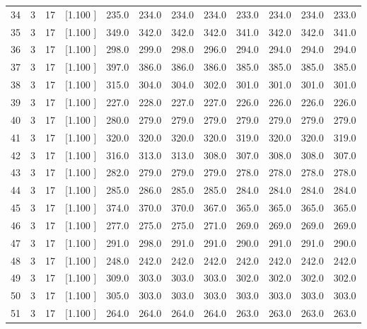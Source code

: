 \documentclass[12pt,a4paper]{article}
\begin{document}
\begin{center}
{\begin{tabular}{r r r r r r r r r r r r}
  34&  3& 17&[1.100     ]&   235.0&   234.0&   234.0&   234.0&   233.0&   234.0&   234.0&   233.0\\[-0.02in]
  35&  3& 17&[1.100     ]&   349.0&   342.0&   342.0&   342.0&   341.0&   342.0&   342.0&   341.0\\[-0.02in]
  36&  3& 17&[1.100     ]&   298.0&   299.0&   298.0&   296.0&   294.0&   294.0&   294.0&   294.0\\[-0.02in]
  37&  3& 17&[1.100     ]&   397.0&   386.0&   386.0&   386.0&   385.0&   385.0&   385.0&   385.0\\[-0.02in]
  38&  3& 17&[1.100     ]&   315.0&   304.0&   304.0&   302.0&   301.0&   301.0&   301.0&   301.0\\[-0.02in]
  39&  3& 17&[1.100     ]&   227.0&   228.0&   227.0&   227.0&   226.0&   226.0&   226.0&   226.0\\[-0.02in]
  40&  3& 17&[1.100     ]&   280.0&   279.0&   279.0&   279.0&   279.0&   279.0&   279.0&   279.0\\[-0.02in]
  41&  3& 17&[1.100     ]&   320.0&   320.0&   320.0&   320.0&   319.0&   320.0&   320.0&   319.0\\[-0.02in]
  42&  3& 17&[1.100     ]&   316.0&   313.0&   313.0&   308.0&   307.0&   308.0&   308.0&   307.0\\[-0.02in]
  43&  3& 17&[1.100     ]&   282.0&   279.0&   279.0&   279.0&   278.0&   278.0&   278.0&   278.0\\[-0.02in]
  44&  3& 17&[1.100     ]&   285.0&   286.0&   285.0&   285.0&   284.0&   284.0&   284.0&   284.0\\[-0.02in]
  45&  3& 17&[1.100     ]&   374.0&   370.0&   370.0&   367.0&   365.0&   365.0&   365.0&   365.0\\[-0.02in]
  46&  3& 17&[1.100     ]&   277.0&   275.0&   275.0&   271.0&   269.0&   269.0&   269.0&   269.0\\[-0.02in]
  47&  3& 17&[1.100     ]&   291.0&   298.0&   291.0&   291.0&   290.0&   291.0&   291.0&   290.0\\[-0.02in]
  48&  3& 17&[1.100     ]&   248.0&   242.0&   242.0&   242.0&   242.0&   242.0&   242.0&   242.0\\[-0.02in]
  49&  3& 17&[1.100     ]&   309.0&   303.0&   303.0&   303.0&   302.0&   302.0&   302.0&   302.0\\[-0.02in]
  50&  3& 17&[1.100     ]&   305.0&   303.0&   303.0&   303.0&   303.0&   303.0&   303.0&   303.0\\[-0.02in]
  51&  3& 17&[1.100     ]&   264.0&   264.0&   264.0&   264.0&   263.0&   263.0&   263.0&   263.0\\[-0.02in]

\end{tabular}}
\end{center}
\end{document}
